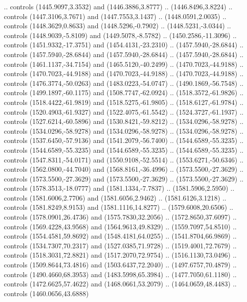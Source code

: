 \begin{scope}[shift={(-22.88722,-49.76189)}]
\begin{scope}[shift={(-739.46591,328.36782)}]
      .. controls (1445.9097,3.3532) and (1446.3886,3.8777) .. (1446.8496,3.8224) ..
      controls (1447.3106,3.7671) and (1447.7553,3.1437) .. (1448.0591,2.0035) ..
      controls (1448.3629,0.8633) and (1448.5296,-0.7902) .. (1448.5231,-3.0344) ..
      controls (1448.9039,-5.8109) and (1449.5078,-8.5782) .. (1450.2586,-11.3096)
      .. controls (1451.9332,-17.3751) and (1454.4131,-23.2310) ..
      (1457.5940,-28.6844) .. controls (1457.5940,-28.6844) and (1457.5940,-28.6844)
      .. (1457.5940,-28.6844) .. controls (1461.1137,-34.7154) and
      (1465.5120,-40.2499) .. (1470.7023,-44.9188) .. controls (1470.7023,-44.9188)
      and (1470.7023,-44.9188) .. (1470.7023,-44.9188) .. controls
      (1476.3774,-50.0263) and (1483.0223,-54.0747) .. (1490.1869,-56.7548) ..
      controls (1499.1897,-60.1175) and (1508.7747,-62.0924) .. (1518.3572,-61.9826)
      .. controls (1518.4422,-61.9819) and (1518.5275,-61.9805) ..
      (1518.6127,-61.9784) .. controls (1520.4903,-61.9327) and (1522.4075,-61.5542)
      .. (1524.3727,-61.1937) .. controls (1527.6214,-60.5896) and
      (1530.8421,-59.8212) .. (1534.0296,-58.9278) .. controls (1534.0296,-58.9278)
      and (1534.0296,-58.9278) .. (1534.0296,-58.9278) .. controls
      (1537.6450,-57.9136) and (1541.2079,-56.7400) .. (1544.6589,-55.3235) ..
      controls (1544.6589,-55.3235) and (1544.6589,-55.3235) .. (1544.6589,-55.3235)
      .. controls (1547.8311,-54.0171) and (1550.9108,-52.5514) ..
      (1553.6271,-50.6346) .. controls (1562.0800,-44.7040) and (1568.8161,-36.4996)
      .. (1573.5500,-27.3629) .. controls (1573.5500,-27.3629) and
      (1573.5500,-27.3629) .. (1573.5500,-27.3629) .. controls (1578.3513,-18.0777)
      and (1581.1334,-7.7837) .. (1581.5906,2.5950) .. controls (1581.6006,2.7706)
      and (1581.6056,2.9462) .. (1581.6126,3.1218) .. controls (1581.8249,8.9153)
      and (1581.1116,14.8277) .. (1579.6008,20.6506) .. controls (1578.0901,26.4736)
      and (1575.7830,32.2056) .. (1572.8650,37.6097) .. controls (1569.4228,43.9568)
      and (1564.9613,49.8329) .. (1559.7097,54.8510) .. controls (1554.4581,59.8692)
      and (1548.4181,64.0255) .. (1541.8704,66.9869) .. controls (1534.7307,70.2317)
      and (1527.0385,71.9728) .. (1519.4001,72.7679) .. controls (1518.3031,72.8821)
      and (1517.2070,72.9754) .. (1516.1130,73.0496) .. controls (1509.8644,73.4816)
      and (1503.6437,72.2040) .. (1497.6757,70.4879) .. controls (1490.4660,68.3953)
      and (1483.5998,65.3984) .. (1477.7050,61.1180) .. controls (1472.6625,57.4622)
      and (1468.0661,53.2079) .. (1464.0659,48.4483) .. controls (1460.0656,43.6888)

\end{scope}
\end{scope}
